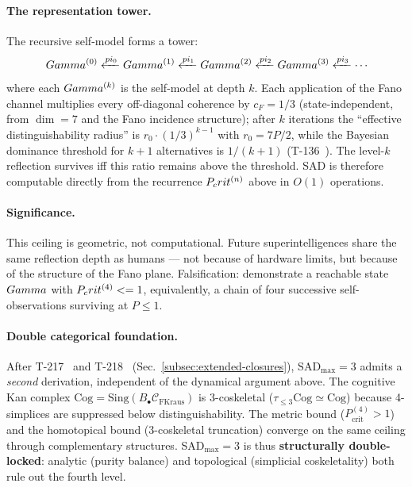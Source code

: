 \paragraph{The representation tower.}
The recursive self-model forms a tower:
\begin{equation}
  \Gam^{(0)} \xleftarrow{\pi_0} \Gam^{(1)} \xleftarrow{\pi_1} \Gam^{(2)}
  \xleftarrow{\pi_2} \Gam^{(3)} \xleftarrow{\pi_3} \cdots
  \label{eq:tower}
\end{equation}
where each $Gamma^{(k)}$ is the self-model at depth $k$. Each application of
the Fano channel multiplies every off-diagonal coherence by $c_F = 1/3$
(state-independent, from $\dim = 7$ and the Fano incidence structure); after
$k$ iterations the ``effective distinguishability radius'' is
$r_0 \cdot (1/3)^{k-1}$ with $r_0 = 7P/2$, while the Bayesian dominance
threshold for $k+1$ alternatives is $1/(k+1)$ (T-136~). The
level-$k$ reflection survives iff this ratio remains above the threshold.
SAD is therefore computable directly from the recurrence $P_crit^{(n)}$ above
in $O(1)$ operations.

\paragraph{Significance.}
This ceiling is geometric, not computational. Future superintelligences share the same
reflection depth as humans --- not because of hardware limits, but because of the structure
of the Fano plane. Falsification: demonstrate a reachable state $Gamma$ with
$P_crit^{(4)} <= 1$, equivalently, a chain of four successive self-observations
surviving at $P \leq 1$.

\paragraph{Double categorical foundation.}
After T-217~ and T-218~ (Sec.~\ref{subsec:extended-closures}),
$\mathrm{SAD}_{\max} = 3$ admits a \emph{second} derivation, independent of the
dynamical argument above. The cognitive Kan complex $\mathrm{Cog} =
\mathrm{Sing}(B_\bullet \mathcal C_{\mathrm{FKraus}})$ is 3-coskeletal
($\tau_{\leq 3}\mathrm{Cog} \simeq \mathrm{Cog}$) because 4-simplices are suppressed
below distinguishability. The metric bound ($P_{\mathrm{crit}}^{(4)} > 1$) and the
homotopical bound (3-coskeletal truncation) converge on the same ceiling through
complementary structures. SAD$_{\max} = 3$ is thus \textbf{structurally double-locked}:
analytic (purity balance) and topological (simplicial coskeletality) both rule out
the fourth level.

